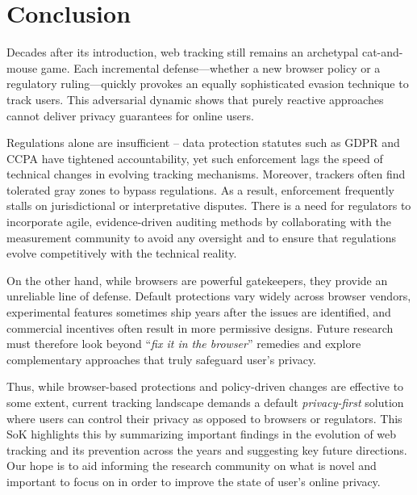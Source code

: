 \section{Conclusion}

Decades after its introduction, web tracking still remains an archetypal cat-and-mouse game.
%
Each incremental defense---whether a new browser policy or a regulatory ruling---quickly provokes an equally sophisticated evasion technique to track users.
%
This adversarial dynamic shows that purely reactive approaches cannot deliver privacy guarantees for online users.

Regulations alone are insufficient -- data protection statutes such as GDPR and CCPA have tightened accountability, yet such enforcement lags the speed of technical changes in evolving tracking mechanisms.
%
Moreover, trackers often find tolerated gray zones to bypass regulations.
%
As a result, enforcement frequently stalls on jurisdictional or interpretative disputes. 
%
There is a need for regulators to incorporate agile, evidence-driven auditing methods by collaborating with the measurement community to avoid any oversight and to ensure that regulations evolve competitively with the technical reality.

On the other hand, while browsers are powerful gatekeepers, they provide an unreliable line of defense.
%
Default protections vary widely across browser vendors, experimental features sometimes ship years after the issues are identified, and commercial incentives often result in more permissive designs. 
%
Future research must therefore look beyond ``\textit{fix it in the browser}'' remedies and explore complementary approaches that truly safeguard user's privacy.

Thus, while browser-based protections and policy-driven changes are effective to some extent, current tracking landscape demands a default \textit{privacy-first} solution where users can control their privacy as opposed to browsers or regulators.
%
This SoK highlights this by summarizing important findings in the evolution of web tracking and its prevention across the years and suggesting key future directions.
%
Our hope is to aid informing the research community on what is novel and important to focus on in order to improve the state of user's online privacy.
